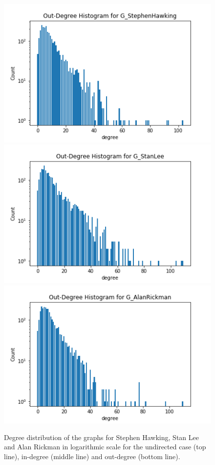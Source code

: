 \documentclass[conference]{IEEEtran}
\begin{document}
\begin{figure}[!htb]
  \includegraphics[width=\linewidth]{degreeoutSH.png}
\endminipage\hfill
{}
  \includegraphics[width=\linewidth]{degreeoutSL.png}
\endminipage\hfill
{}%
  \includegraphics[width=\linewidth]{degreeoutAR.png}
\endminipage

\caption{Degree distribution of the graphs for Stephen Hawking, Stan Lee and Alan Rickman in logarithmic scale for the undirected case (top line), in-degree (middle line) and out-degree (bottom line).  }
\end{figure}
\end{document}
